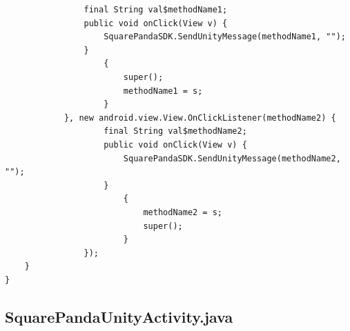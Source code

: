 \documentclass[9pt, b5paper]{article}
\begin{document}
\begin{verbatim}
                final String val$methodName1;
                public void onClick(View v) {
                    SquarePandaSDK.SendUnityMessage(methodName1, "");
                }
                    {
                        super();
                        methodName1 = s;
                    }
            }, new android.view.View.OnClickListener(methodName2) {
                    final String val$methodName2;
                    public void onClick(View v) {
                        SquarePandaSDK.SendUnityMessage(methodName2, "");
                    }
                        {
                            methodName2 = s;
                            super();
                        }
                });
    }
}
\end{verbatim}
\subsection{SquarePandaUnityActivity.java}
\label{sec-1-4}
\end{document}
